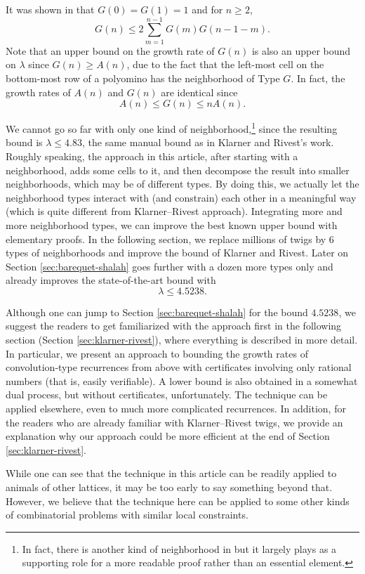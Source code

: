 \documentclass[a4paper,12pt]{article}
\begin{document}
It was shown in \cite{bui2025bounding} that $G(0)=G(1)=1$ and for $n\ge 2$,
\[
    G(n) \le 2\sum_{m=1}^{n-1} G(m)G(n-1-m).
\]
Note that an upper bound on the growth rate of $G(n)$ is also an upper bound on $\lambda$ since $G(n)\ge A(n)$, due to the fact that the left-most cell on the bottom-most row of a polyomino has the neighborhood of Type $G$. In fact, the growth rates of $A(n)$ and $G(n)$ are identical since
\[
    A(n)\le G(n)\le nA(n).
\]

We cannot go so far with only one kind of neighborhood,\footnote{In fact, there is another kind of neighborhood in \cite{bui2025bounding} but it largely plays as a supporting role for a more readable proof rather than an essential element.} since the resulting bound is $\lambda\le 4.83$, the same manual bound as in Klarner and Rivest's work. 
Roughly speaking, the approach in this article, after starting with a neighborhood, adds some cells to it, and then decompose the result into smaller neighborhoods, which may be of different types. By doing this, we actually let the neighborhood types interact with (and constrain) each other in a meaningful way (which is quite different from Klarner--Rivest approach).
Integrating more and more neighborhood types, we can improve the best known upper bound with elementary proofs. In the following section, we replace millions of twigs by $6$ types of neighborhoods and improve the bound of Klarner and Rivest. Later on Section \ref{sec:barequet-shalah} goes further with a dozen more types only and already improves the state-of-the-art bound with
\[
	\lambda \le 4.5238.
\]

Although one can jump to Section \ref{sec:barequet-shalah} for the bound $4.5238$, we suggest the readers to get familiarized with the approach first in the following section  (Section \ref{sec:klarner-rivest}), where everything is described in more detail.
In particular, we present an approach to bounding the growth rates of convolution-type recurrences from above with certificates involving only rational numbers (that is, easily verifiable). A lower bound is also obtained in a somewhat dual process, but without certificates, unfortunately. The technique can be applied elsewhere, even to much more complicated recurrences.
In addition, for the readers who are already familiar with Klarner--Rivest twigs, we provide an explanation why our approach could be more efficient at the end of Section \ref{sec:klarner-rivest}.

While one can see that the technique in this article can be readily applied to animals of other lattices, it may be too early to say something beyond that. However, we believe that the technique here can be applied to some other kinds of combinatorial problems with similar local constraints.
\end{document}
